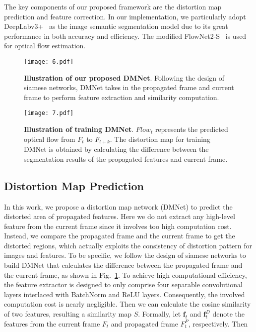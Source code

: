\documentclass[journal]{IEEEtran}
\begin{document}
The key components of our proposed framework are the distortion map prediction and feature correction. In our implementation, we particularly adopt DeepLabv3+~\cite{chen2018encoder} as the image semantic segmentation model due to its great performance in both accuracy and efficiency. The modified FlowNet2-S~\cite{ilg2017flownet} is used for optical flow estimation. 

\begin{figure}[t]
	\begin{center}
		\texttt{[image: 6.pdf]}
	\end{center}
	\caption{\textbf{Illustration of our proposed DMNet}. Following the design of siamese networks, DMNet takes in the propagated frame and current frame to perform feature extraction and similarity computation.}
	\label{DMNet}
\end{figure}

\begin{figure}[t]
	\begin{center}
		\texttt{[image: 7.pdf]}
	\end{center}
	\caption{\textbf{Illustration of training DMNet}. $Flow_{t}$ represents the predicted optical flow from $F_{t}$ to $F_{t+k}$. The distortion map for training DMNet is obtained by calculating the difference between the segmentation results of the propagated features and current frame.}
	\label{DMNet_training}
\end{figure}

\subsection{Distortion Map Prediction}

In this work, we propose a distortion map network (DMNet) to predict the distorted area of propagated features. Here we do not extract any high-level feature from the current frame since it involves too high computation cost. Instead, we compare the propagated frame and the current frame to get the distorted regions, which actually exploits the consistency of distortion pattern for images and features. 
To be specific, we follow the design of siamese networks to build DMNet that calculates the difference between the propagated frame and the current frame, as shown in Fig.~\ref{DMNet}. To achieve high computational efficiency, the feature extractor is designed to only comprise four separable convolutional layers interlaced with BatchNorm and ReLU layers. Consequently, the involved computation cost is nearly negligible. Then we can calculate the cosine similarity of two features, resulting a similarity map ${S}$. Formally, let $\mathbf{f}_{t}$ and $\mathbf{f}^{D}_{t}$ denote the features from the current frame $F_{t}$ and propagated frame $F^{P}_{t}$, respectively. Then
\end{document}
